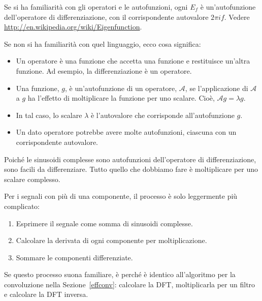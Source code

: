 \documentclass[12pt]{book} \usepackage[width=5.5in,height=8.5in, hmarginratio=3:2,vmarginratio=1:1]{geometry}
\begin{document}
Se si ha familiarità con gli operatori e le autofunzioni, ogni $E_f$ è un'autofunzione dell'operatore di differenziazione, con il corrispondente autovalore $2 \pi i f$. Vedere \url{http://en.wikipedia.org/wiki/Eigenfunction}.

Se non si ha familiarità con quel linguaggio, ecco cosa significa:

\newcommand{\op}{\mathcal{A}}

\begin{itemize} 

\item Un operatore è una funzione che accetta una funzione e restituisce un'altra funzione. Ad esempio, la differenziazione è un operatore.

\item Una funzione, $g$, è un'autofunzione di un operatore, $\op$, se l'applicazione di $\op$ a $g$ ha l'effetto di moltiplicare la funzione per uno scalare. Cioè, $\op g = \lambda g$.

\item In tal caso, lo scalare $\lambda$ è l'autovalore che corrisponde all'autofunzione $g$.

\item Un dato operatore potrebbe avere molte autofunzioni, ciascuna con un corrispondente autovalore.

\end{itemize} 

Poiché le sinusoidi complesse sono autofunzioni dell'operatore di differenziazione, sono facili da differenziare. Tutto quello che dobbiamo fare è moltiplicare per uno scalare complesso.

Per i segnali con più di una componente, il processo è solo leggermente più complicato:

\begin{enumerate} 

\item Esprimere il segnale come somma di sinusoidi complesse.

\item Calcolare la derivata di ogni componente per moltiplicazione.

\item Sommare le componenti differenziate.

\end{enumerate} 

Se questo processo suona familiare, è perché è identico all'algoritmo per la convoluzione nella Sezione~\ref{effconv}: calcolare la DFT, moltiplicarla per un filtro e calcolare la DFT inversa.
\end{document}

